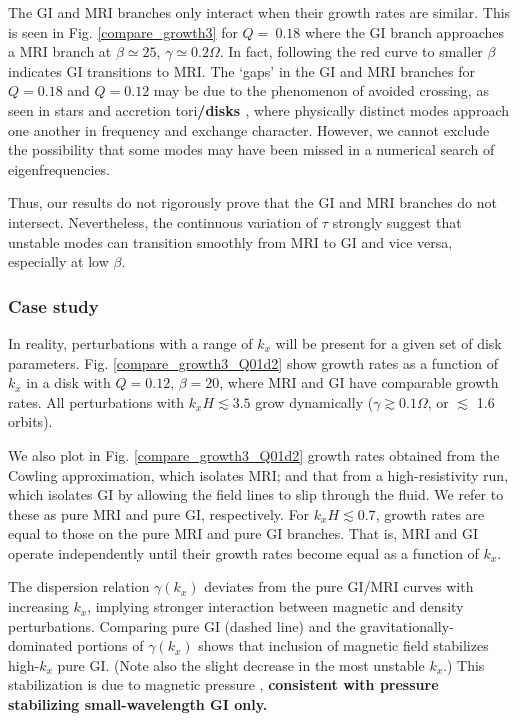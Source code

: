 The GI and MRI branches only interact when their growth rates
are similar. This is seen in Fig. \ref{compare_growth3} for $Q=~0.18$
where the GI branch approaches a MRI branch at $\beta\simeq 25,\,
\gamma\simeq 0.2\Omega$. In fact, following the red curve to smaller
$\beta$ indicates GI transitions to MRI. The
`gaps' in the GI and MRI branches for $Q=0.18$ and $Q=0.12$ may be due
to the phenomenon of avoided crossing, as seen in stars
\citep[e.g.][]{aizenman77} and accretion tori{\bf /disks
\citep[e.g.][]{christo93,ogilvie98}}, where physically distinct modes approach
one another in frequency and exchange character. However, we cannot
exclude the possibility  that some modes may have been missed in a 
numerical search of eigenfrequencies.  

Thus, our results do not rigorously prove that the GI and MRI branches
do not intersect.  Nevertheless, the continuous variation of $\tau$
strongly suggest that unstable modes can transition smoothly from 
MRI to GI and vice versa, especially at low $\beta$.     

\subsubsection{Case study} 
In reality, perturbations with a range of $k_x$ will be present for a
given set of disk parameters. Fig. \ref{compare_growth3_Q01d2} show
growth rates as a function of $k_x$ in a disk with
$Q=0.12,\,\beta=20$, where MRI and GI have comparable growth
rates. All perturbations with $k_xH \lesssim 3.5$ grow dynamically
($\gamma\gtrsim 0.1\Omega$, or $\lesssim$ 1.6 orbits).

We also plot in Fig. \ref{compare_growth3_Q01d2} growth rates obtained 
from the Cowling approximation, which isolates MRI; and that from a
high-resistivity run, which isolates GI by allowing the field lines to
slip through the fluid. We refer to these as  
pure MRI and pure GI, respectively.  
For $k_xH\lesssim 0.7$, growth rates are equal to
those on the pure MRI and pure GI branches. That is, MRI and GI
operate independently until their growth rates become equal as a
function of $k_x$.  

The dispersion relation $\gamma(k_x)$ deviates from the
pure GI/MRI curves with increasing $k_x$, implying stronger interaction between
magnetic and density perturbations. Comparing pure GI (dashed line)
and the gravitationally-dominated portions of $\gamma(k_x)$ shows that 
inclusion of magnetic field stabilizes high-$k_x$ pure GI. (Note also
the slight decrease in the most unstable $k_x$.) 
This stabilization is due to magnetic pressure \citep{lizano10}, {\bf 
consistent with pressure stabilizing small-wavelength GI only.}    

